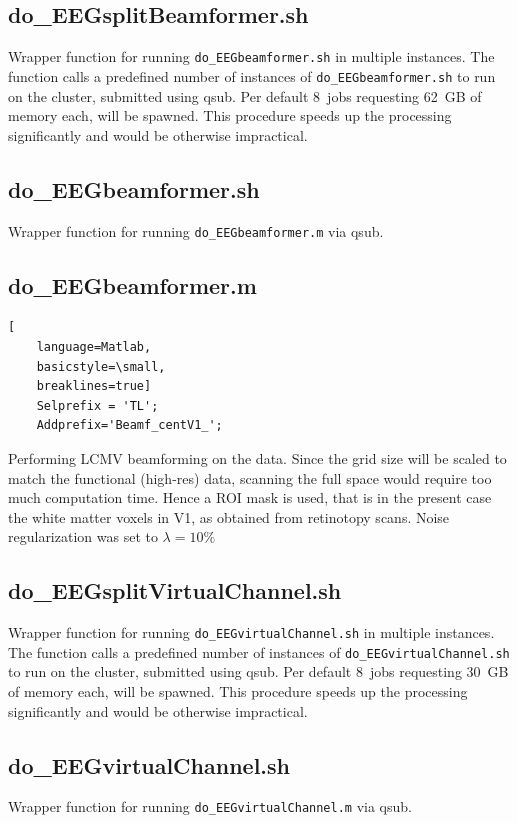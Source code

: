 \documentclass[12pt,a4paper]{scrartcl}
\begin{document}
\subsection{do\_EEGsplitBeamformer.sh}
\label{sec:beamf}
Wrapper function for running \texttt{do\_EEGbeamformer.sh} in multiple instances. The function calls a predefined number of instances of \texttt{do\_EEGbeamformer.sh} to run on the cluster, submitted using qsub. Per default 8~jobs requesting 62~GB of memory each, will be spawned. This procedure speeds up the processing significantly and would be otherwise impractical.\\

\subsection{do\_EEGbeamformer.sh}
Wrapper function for running \texttt{do\_EEGbeamformer.m} via qsub.

\subsection{do\_EEGbeamformer.m}
\begin{lstlisting}[
    language=Matlab,
    basicstyle=\small,
    breaklines=true]
    Selprefix = 'TL';
    Addprefix='Beamf_centV1_';
\end{lstlisting}
Performing LCMV beamforming on the data. Since the grid size will be scaled to match the functional (high-res) data, scanning the full space would require too much computation time. Hence a ROI mask is used, that is in the present case the white matter voxels in V1, as obtained from retinotopy scans. Noise regularization was set to $\lambda=10\%$

\subsection{do\_EEGsplitVirtualChannel.sh}
\label{sec:virtch}
Wrapper function for running \texttt{do\_EEGvirtualChannel.sh} in multiple instances. The function calls a predefined number of instances of \texttt{do\_EEGvirtualChannel.sh} to run on the cluster, submitted using qsub. Per default 8~jobs requesting 30~GB of memory each, will be spawned. This procedure speeds up the processing significantly and would be otherwise impractical.\\

\subsection{do\_EEGvirtualChannel.sh}
Wrapper function for running \texttt{do\_EEGvirtualChannel.m} via qsub.
\end{document}
